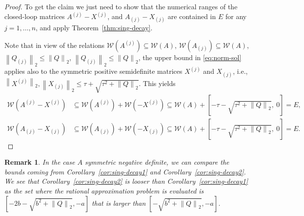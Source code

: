 \documentclass[a4paper,10pt]{article}
\newcommand{\norm}[1]{\left\lVert#1\right\rVert}
\newtheorem{remark}{Remark}
\begin{document}
\begin{proof}
	To get the claim we just need to show that the numerical ranges of the closed-loop matrices $A^{(j)}-X^{(j)}$, and $A_{(j)}-X_{(j)}$ are contained in $E$ for any $j=1,\dots, n$, and apply Theorem~\ref{thm:sing-decay}.
	
	Note that in view of the relations $\mathcal W(A^{(j)})\subseteq\mathcal W(A)$, $\mathcal W(A_{(j)})\subseteq\mathcal W(A)$, $\norm{Q_{(j)}}_2\le \norm{Q}_2$, $\norm{Q_{(j)}}_2\le \norm{Q}_2$, the upper bound in \eqref{eq:norm-sol} applies also to the symmetric positive semidefinite matrices $X^{(j)}$ and $X_{(j)}$, i.e., $\norm{X^{(j)}}_2, \norm{X_{(j)}}_2\leq \tau +\sqrt{\tau^2+\norm{Q}_2}$. 
	This yields
	\begin{align*}
	\mathcal W(A^{(j)}-X^{(j)})&\subseteq \mathcal W(A^{(j)}) + \mathcal W(-X^{(j)})\subseteq \mathcal W(A) + \left[-\tau -\sqrt{\tau^2+\norm{Q}_2},\ 0\right]= E,\\
		\mathcal W(A_{(j)}-X_{(j)})&\subseteq \mathcal W(A_{(j)}) + \mathcal W(-X_{(j)})\subseteq \mathcal W(A) + \left[-\tau -\sqrt{\tau^2+\norm{Q}_2},\ 0\right]= E.
	\end{align*}
\end{proof}
\begin{remark}
	In the case $A$ symmetric negative definite, we can compare the bounds coming from  Corollary~\ref{cor:sing-decay1} and Corollary~\ref{cor:sing-decay2}. We see that  Corollary~\ref{cor:sing-decay2} is  looser than Corollary~\ref{cor:sing-decay1} as the set where the rational approximation problem is evaluated is  $[-2b-\sqrt{b^2+\norm{Q}_2}, -a]$ that is larger than  $[-\sqrt{b^2+\norm{Q}_2}, -a]$. 
\end{remark}
\end{document}
